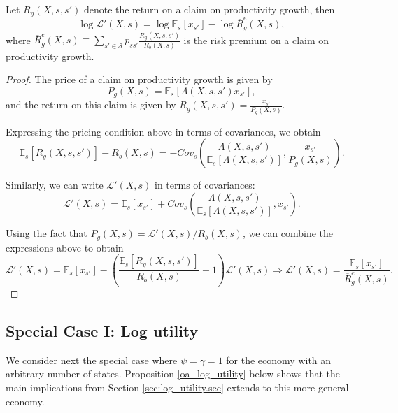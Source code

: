 \begin{corollary} Let $R_g(X,s,s')$ denote the return on a claim on productivity growth, then
\begin{equation}
    \log \mathcal{L}'(X,s) = \log \mathbb{E}_s[x_{s'}] - \log \overline{R}^e_{g}(X,s),
\end{equation}
where $\overline{R}^e_{g}(X,s) \equiv \sum_{s'\in \mathcal{S}} p_{ss'} \frac{R_{g}(X,s,s')}{ R_b(X,s)} $ is the risk premium on a claim on productivity growth.
\begin{proof} The price of a claim on productivity growth is given by
\begin{equation}
    P_g(X,s) = \mathbb{E}_s[ \Lambda(X,s,s') x_{s'} ],
\end{equation}
and the return on this claim is given by $R_g(X,s,s') = \frac{x_{s'}}{P_g(X,s)}$.

Expressing the pricing condition above in terms of covariances, we obtain
\begin{equation}
    \mathbb{E}_s[R_g(X,s,s')] - R_b(X,s) = - Cov_s\left( \frac{\Lambda(X,s,s')}{\mathbb{E}_s[\Lambda(X,s,s')]} ,  \frac{x_{s'}}{P_g(X,s)} \right).
\end{equation}

Similarly, we can write $\mathcal{L}'(X,s)$ in terms of covariances:
\begin{equation}
    \mathcal{L}'(X,s) = \mathbb{E}_s[x_{s'}] + Cov_s\left( \frac{\Lambda(X,s,s')}{\mathbb{E}_s[\Lambda(X,s,s')]} ,  x_{s'}\right).
\end{equation}

Using the fact that $P_g(X,s) = \mathcal{L}'(X,s) / R_b(X,s)$, we can combine the expressions above to obtain
\begin{equation}
    \mathcal{L}'(X,s) = \mathbb{E}_s[x_{s'}] -\left(\frac{\mathbb{E}_s[R_g(X,s,s')]}{R_b(X,s)} - 1\right)\mathcal{L}'(X,s) \Rightarrow \mathcal{L}'(X,s) = \frac{\mathbb{E}_s[x_{s'}]}{\overline{R}_g^e(X,s)}.
\end{equation}
    
\end{proof}
    
\end{corollary}

\subsection{Special Case I: Log utility}

We consider next the special case where $\psi = \gamma = 1$ for the economy with an arbitrary number of states. 
Proposition \ref{oa_log_utility} below shows that the main implications from Section \ref{sec:log_utility.sec} extends to this more general economy. 

